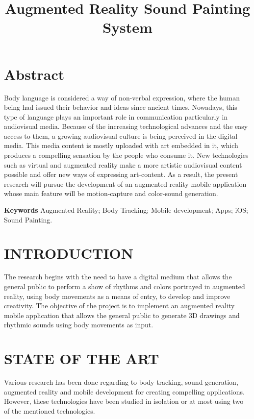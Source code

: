 \documentclass[twocolumn]{article}
\title{Augmented Reality Sound Painting System}
\author{}
\date{}
\begin{document}
\maketitle

 \section*{Abstract}
 Body language is considered a way of non-verbal expression, where the human being had issued 
 their behavior and ideas since ancient times. Nowadays, this type of language plays an 
 important role in communication particularly in audiovisual media. Because of the increasing 
 technological advances and the easy access to them, a growing audiovisual culture is being 
 perceived in the digital media. This media content is mostly uploaded with art embedded in 
 it, which produces a compelling sensation by the people who consume it. New technologies such
 as virtual and augmented reality make a more artistic audiovisual content possible and offer 
 new ways of expressing art-content. As a result, the present research will pursue the 
 development of an augmented reality mobile application whose main feature will be 
 motion-capture and color-sound generation.


 \noindent\textbf{Keywords} Augmented Reality; Body Tracking; Mobile development; Apps; iOS; Sound Painting.
 
 
 \section{INTRODUCTION}
 The research begins with the need to have a digital medium that allows the general public to 
 perform a show of rhythms and colors portrayed in augmented reality, using body movements as 
 a means of entry, to develop and improve creativity. The objective of the project is to 
 implement an augmented reality mobile application that allows the general public to generate 
 3D drawings and rhythmic sounds using body movements as input.
 
 
 \section{STATE OF THE ART}
 Various research has been done regarding to body tracking, sound
 generation, augmented reality and mobile development for
 creating compelling applications. However, these technologies
 have been studied in isolation or at most using two of the
 mentioned technologies.
\bigskip
\end{document}
